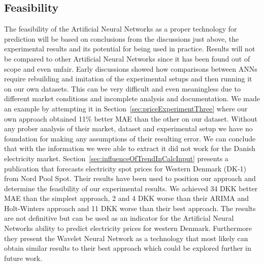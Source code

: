 \subsection{Feasibility}
The feasibility of the Artificial Neural Networks as a proper technology for prediction will be based on conclusions from the discussions just above, the experimental results and its potential for being used in practice. Results will not be compared to other Artificial Neural Networks since it has been found out of scope and even unfair. Early discussions showed how comparisons between ANNs require rebuilding and imitation of the experimental setups and then running it on our own datasets. This can be very difficult and even meaningless due to different market conditions and incomplete analysis and documentation. We made an example by attempting it in Section~\ref{sec:priceExperimentThree} where our own approach obtained 11\% better MAE than the other on our dataset. Without any prober analysis of their market, dataset and experimental setup we have no foundation for making any assumptions of their resulting error. We can conclude that with the information we were able to extract it did not work for the Danish electricity market. Section~\ref{sec:influenceOfTrendInCalcInput} presents a publication that forecasts electricity spot prices for Western Denmark (DK-1) from Nord Pool Spot. Their results have been used to position our approach and determine the feasibility of our experimental results. We achieved 34 DKK better MAE than the simplest approach, 2 and 4 DKK worse than their ARIMA and Holt-Winters approach and 11 DKK worse than their best approach. The results are not definitive but can be used as an indicator for the Artificial Neural Networks ability to predict electricity prices for western Denmark. Furthermore they present the Wavelet Neural Network as a technology that most likely can obtain similar results to their best approach which could be explored further in future work.

